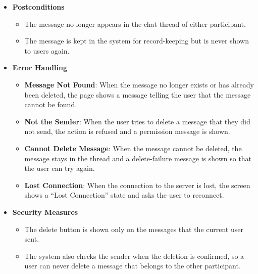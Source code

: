 \begin{itemize}[leftmargin=1.6em,topsep=4pt,itemsep=3pt,parsep=0pt,label=$\bullet$]
        \begin{itemize}[leftmargin=2.2em,topsep=2pt,itemsep=3pt,parsep=0pt,label=$\circ$]
            \item \textbf{Delete a File Message}: When the deleted message contains a file, the whole file message is removed from the thread in the same way.
            \item \textbf{Message Already Deleted}: When the message has already been deleted, the delete button is not available for it.
        \end{itemize}
    \item \textbf{Postconditions}

        \begin{itemize}[leftmargin=2.2em,topsep=2pt,itemsep=3pt,parsep=0pt,label=$\circ$]
            \item The message no longer appears in the chat thread of either participant.
            \item The message is kept in the system for record-keeping but is never shown to users again.
        \end{itemize}
    \item \textbf{Error Handling}

        \begin{itemize}[leftmargin=2.2em,topsep=2pt,itemsep=3pt,parsep=0pt,label=$\circ$]
            \item \textbf{Message Not Found}: When the message no longer exists or has already been deleted, the page shows a message telling the user that the message cannot be found.
            \item \textbf{Not the Sender}: When the user tries to delete a message that they did not send, the action is refused and a permission message is shown.
            \item \textbf{Cannot Delete Message}: When the message cannot be deleted, the message stays in the thread and a delete-failure message is shown so that the user can try again.
            \item \textbf{Lost Connection}: When the connection to the server is lost, the screen shows a ``Lost Connection'' state and asks the user to reconnect.
        \end{itemize}
    \item \textbf{Security Measures}

        \begin{itemize}[leftmargin=2.2em,topsep=2pt,itemsep=3pt,parsep=0pt,label=$\circ$]
            \item The delete button is shown only on the messages that the current user sent.
            \item The system also checks the sender when the deletion is confirmed, so a user can never delete a message that belongs to the other participant.
        \end{itemize}
\end{itemize}
